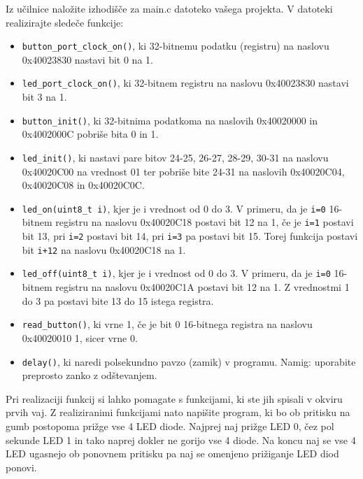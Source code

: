 \documentclass[12pt,letterpaper]{article}
\begin{document}
Iz učilnice naložite izhodišče za main.c datoteko vašega projekta. V datoteki realizirajte sledeče funkcije:

\begin{itemize}
    \item \texttt{button\_port\_clock\_on()}, ki 32-bitnemu podatku (registru) na naslovu 0x40023830 nastavi bit 0 na 1.
    \item \texttt{led\_port\_clock\_on()}, ki 32-bitnem registru na naslovu
    0x40023830 nastavi bit 3 na 1.
    \item \texttt{button\_init()}, ki 32-bitnima podatkoma na naslovih 0x40020000 in 0x4002000C pobriše bita 0 in 1.
    \item \texttt{led\_init()}, ki nastavi pare bitov 24-25, 26-27, 28-29, 30-31 na naslovu 0x40020C00 na vrednost 01 ter pobriše bite 24-31 na naslovih 0x40020C04, 0x40020C08 in 0x40020C0C.
    \item \texttt{led\_on(uint8\_t i)}, kjer je i vrednost od 0 do 3. V primeru, da je \texttt{i=0} 16-bitnem registru na naslovu 0x40020C18 postavi bit 12 na 1, če je \texttt{i=1} postavi bit 13, pri \texttt{i=2} postavi bit 14, pri \texttt{i=3} pa postavi bit 15. Torej funkcija postavi bit \texttt{i+12} na naslovu 0x40020C18 na 1.
    \item \texttt{led\_off(uint8\_t i)}, kjer je i vrednost od 0 do 3. V primeru, da je \texttt{i=0} 16-bitnem registru na naslovu 0x40020C1A postavi bit 12 na 1. Z vrednostmi 1 do 3 pa postavi bite 13 do 15 istega registra. 
    \item \texttt{read\_button()}, ki vrne 1, če je bit 0 16-bitnega registra na naslovu 0x40020010 1, sicer vrne 0. 
    \item \texttt{delay()}, ki naredi polsekundno pavzo (zamik) v programu. Namig: uporabite preprosto zanko z odštevanjem.
\end{itemize}

Pri realizaciji funkcij si lahko pomagate s funkcijami, ki ste jih spisali v okviru prvih vaj. Z realiziranimi funkcijami nato napišite program, ki bo ob pritisku na gumb postopoma prižge vse 4 LED diode. Najprej naj prižge LED 0, čez pol sekunde LED 1 in tako naprej dokler ne gorijo vse 4 diode. Na koncu naj se vse 4 LED ugasnejo ob ponovnem pritisku pa naj se omenjeno prižiganje LED diod ponovi.
\end{document}
